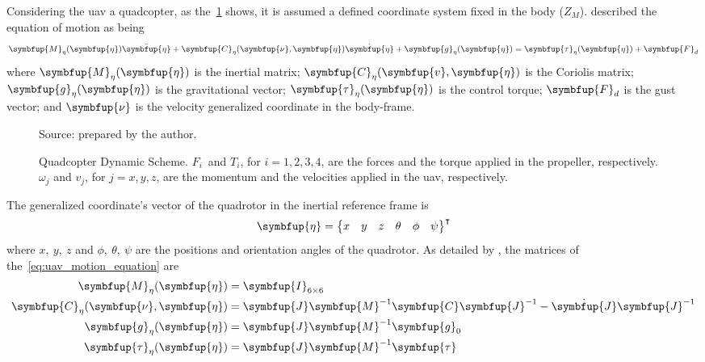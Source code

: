 Considering the \gls*{uav} a quadcopter, as the~\cref{fig:quadcopter_forces_scheme} shows, it is assumed a defined coordinate system fixed in the body (\(Z_M\)). \citet{fossen1994} described the equation of motion as being
%
\begin{equation}
    \symbfup{M}_{\eta}(\symbfup{\eta})\ddot{\symbfup{\eta}} +
    \symbfup{C}_{\eta}(\symbfup{\nu},\symbfup{\eta})\dot{\symbfup{\eta}} +
    \symbfup{g}_{\eta}(\symbfup{\eta}) =
    \symbfup{\tau}_{\eta}(\symbfup{\eta}) + 
    \symbfup{F}_d
    \label{eq:uav_motion_equation}
\end{equation}
%
where \(\symbfup{M}_{\eta}(\symbfup{\eta})\) is the inertial matrix; \(\symbfup{C}_{\eta}(\symbfup{v},\symbfup{\eta})\) is the Coriolis matrix; \(\symbfup{g}_{\eta}(\symbfup{\eta})\) is the gravitational vector; \(\symbfup{\tau}_{\eta}(\symbfup{\eta})\) is the control torque; \(\symbfup{F}_d\) is the gust vector; and \(\symbfup{\nu}\) is the velocity generalized coordinate in the body-frame.
%
\begin{figure}[!htb]
    \centering
    \caption[Quadcopter Dynamic Scheme]{Quadcopter Dynamic Scheme. \(F_i\,\) and \(T_i\), for \(i=1,2,3,4\), are the forces and the torque applied in the propeller, respectively. \(\omega_j\) and \(v_j\), for \(j=x,y,z\), are the momentum and the velocities applied in the \gls*{uav}, respectively.}
    
    \begin{flushleft}\footnotesize
        Source: prepared by the author.
    \end{flushleft}
    
    \label{fig:quadcopter_forces_scheme}
\end{figure}
%
The generalized coordinate's vector of the quadrotor in the inertial reference frame is
%
\begin{equation}
    \symbfup{\eta} = \begin{Bmatrix}
        x & y & z & \theta & \phi & \psi
    \end{Bmatrix}^{\intercal}
\end{equation}
%
where \(x,\ y,\ z\) and \(\phi,\ \theta,\ \psi\) are the positions and orientation angles of the quadrotor.
As detailed by \citet{geronel2023}, the matrices of the~\cref{eq:uav_motion_equation} are
%
\begin{align}
    \symbfup{M}_{\eta}(\symbfup{\eta}) &= \symbfup{I}_{6\times6} \\
    \symbfup{C}_{\eta}(\symbfup{\nu},\symbfup{\eta}) &= \symbfup{J}\symbfup{M}^{-1}\symbfup{C}\symbfup{J}^{-1} - \dot{\symbfup{J}}\symbfup{J}^{-1} \\
    \symbfup{g}_{\eta}(\symbfup{\eta}) &= \symbfup{J}\symbfup{M}^{-1}\symbfup{g}_{0} \\
    \symbfup{\tau}_{\eta}(\symbfup{\eta}) &= \symbfup{J}\symbfup{M}^{-1}\symbfup{\tau}
    \label{eq:matrices_dynamic}
\end{align}
